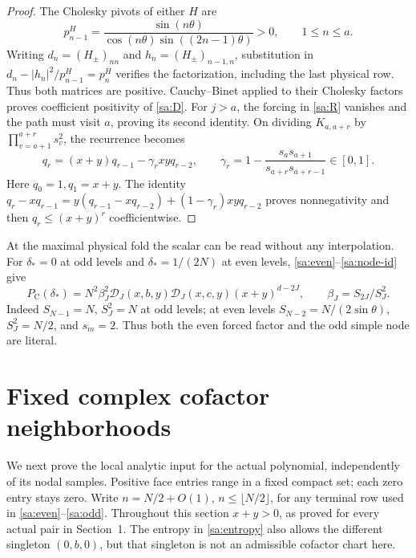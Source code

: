 \documentclass[11pt]{article}
\numberwithin{equation}{section}
\theoremstyle{definition}\newtheorem{definition}[theorem]{Definition}
\theoremstyle{remark}\newtheorem{remark}[theorem]{Remark}
\begin{document}
\begin{proof}
The Cholesky pivots of either $H$ are
\[
 p_{n-1}^{H}=\frac{\sin(n\theta)}
                     {\cos(n\theta)\sin((2n-1)\theta)}>0,
                         \qquad1\le n\le a.
\]
Writing $d_n=(H_\pm)_{nn}$ and $h_n=(H_\pm)_{n-1,n}$, substitution
in $d_n-|h_n|^2/p_{n-1}^{H}=p_n^{H}$ verifies the
factorization, including the last physical row. Thus both matrices
are positive. Cauchy--Binet applied to their Cholesky factors proves
coefficient positivity of \eqref{sa:D}.
For $j>a$, the forcing in \eqref{sa:R} vanishes and the path must
visit $a$, proving its second identity. On dividing $K_{a,a+r}$ by
$\prod_{v=a+1}^{a+r}s_v^2$, the recurrence becomes
\[
 q_r=(x+y)q_{r-1}-\gamma_rxyq_{r-2},\qquad
 \gamma_r=1-\frac{s_as_{a+1}}{s_{a+r}s_{a+r-1}}\in[0,1].
\]
Here $q_0=1,q_1=x+y$. The identity
$q_r-xq_{r-1}=y(q_{r-1}-xq_{r-2})+(1-\gamma_r)xyq_{r-2}$
proves nonnegativity and then $q_r\le(x+y)^r$ coefficientwise.
\end{proof}

At the maximal physical fold the scalar can be read without any
interpolation. For $\delta_*=0$ at odd levels and $\delta_*=1/(2N)$
at even levels, \eqref{sa:even}--\eqref{sa:node-id} give
\begin{equation}\label{sa:anchor}
 P_{\mathrm C}(\delta_*)=N^2\beta_J^2
          \mathcal D_J(x,b,y)\mathcal D_J(x,c,y)(x+y)^{d-2J},
                       \qquad \beta_J=S_{2J}/S_J^2.
\end{equation}
Indeed $S_{N-1}=N$, $S_J^2=N$ at odd levels; at even levels
$S_{N-2}=N/(2\sin\theta)$, $S_J^2=N/2$, and $s_m=2$.
Thus both the even forced factor and the odd simple node are literal.

\section{Fixed complex cofactor neighborhoods}\label{sa:packets}
We next prove the local analytic input for the actual polynomial,
independently of its nodal samples. Positive face entries range in a
fixed compact set; each zero entry stays zero. Write $n=N/2+O(1)$,
$n\le\lfloor N/2\rfloor$, for any terminal row used in
\eqref{sa:even}--\eqref{sa:odd}.
Throughout this section $x+y>0$, as proved for every actual pair in
Section~1. The entropy in \eqref{sa:entropy} also allows the different
singleton $(0,b,0)$, but that singleton is not an admissible cofactor
chart here.
\end{document}
